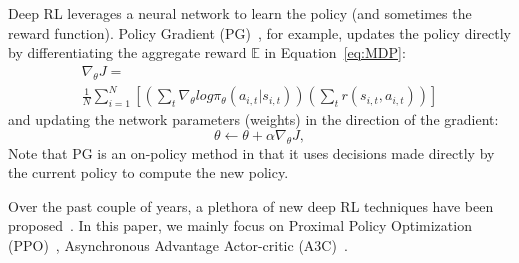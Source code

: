Deep RL leverages a neural network to learn the policy (and sometimes the reward function).
Policy Gradient (PG)~\cite{sutton2000}, %
for example, updates the policy directly by differentiating the aggregate reward $\mathbb{E}$ in Equation~\ref{eq:MDP}:
\begin{multline}
\label{eq:policygradient}
    \nabla_\theta J =  \\
    \frac{1}{N}\sum_{i=1}^{N} \left[ (\sum_{t}^{}\nabla_\theta log\pi_\theta(a_{i,t}|s_{i,t}))(\sum_{t}^{}r(s_{i,t},a_{i,t})) \right]
\end{multline}
and updating the network parameters (weights) in the direction of the gradient:
\begin{equation}
    \theta \leftarrow \theta+\alpha\nabla_\theta J,
\end{equation}
Note that PG is an on-policy method in that it uses decisions made directly by the current policy to compute the new policy.

Over the past couple of years, a plethora of new deep RL techniques have been proposed~\cite{mnih2016asynchronous,ross2011}. In this paper, we mainly focus on Proximal Policy Optimization (PPO)~\cite{schulman2017proximal}, 
Asynchronous Advantage Actor-critic (A3C)~\cite{mnih2016asynchronous}.

